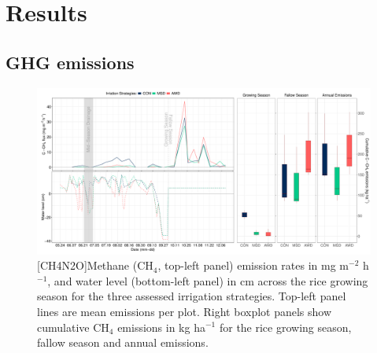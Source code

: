 \section{Results}
\label{sec:results}

\subsection{GHG emissions} 

\begin{figure} [ht]
\captionsetup{justification=justified}
	\centering 
	\includegraphics[scale=0.33, center]{Figures/Chapter_2/CH4_flux_water_acc.pdf}
	[CH4N2O]{Methane (CH$_{4}$, top-left panel) emission rates in mg m$^{-2}$ h$^{-1}$, and water level (bottom-left panel) in cm across the rice growing season for the three assessed irrigation strategies. Top-left panel lines are mean emissions per plot. Right boxplot panels show cumulative CH$_{4}$ emissions in kg ha$^{-1}$ for the rice growing season, fallow season and annual emissions.}  
	\label{CH4N2O}
\end{figure}

